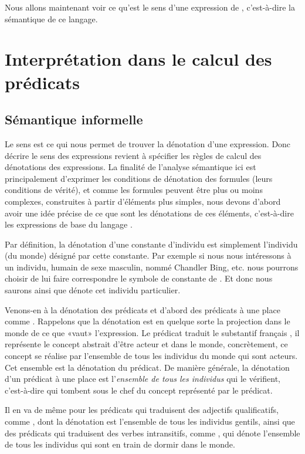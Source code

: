 Nous allons maintenant voir ce qu'est le sens d'une expression de
{\LO}, c'est-à-dire la sémantique de ce langage.



\section{Interprétation dans le calcul des prédicats}
\label{S:semCP}


\subsection{Sémantique informelle}
\label{s:seminf}

Le sens est ce qui nous permet de trouver la dénotation d'une
expression.  Donc décrire le sens des expressions revient à spécifier
les règles de calcul des dénotations des expressions.
La finalité de l'analyse sémantique ici est principalement d'exprimer
les conditions de dénotation des formules (leurs conditions de
vérité), et comme les formules peuvent être plus ou moins complexes,
construites à partir d'éléments plus simples, nous devons d'abord
avoir une idée précise de ce que sont les dénotations de ces éléments,
c'est-à-dire les expressions de base du langage {\LO}.

Par définition, la dénotation d'une constante d'individu est
simplement l'individu (du monde) désigné par cette constante.  Par
exemple si nous nous intéressons à un individu, humain de sexe
masculin, nommé Chandler Bing, etc. nous pourrons choisir de lui faire
correspondre le symbole de constante  de {\LO}.  Et donc nous
saurons ainsi que   dénote cet individu particulier.

Venons-en à la dénotation des prédicats et d'abord des prédicats à une
place comme .  Rappelons que la dénotation est en quelque
sorte la projection dans le monde de ce que «vaut» l'expression.
Le prédicat  traduit le substantif français
, il représente le concept abstrait d'être acteur et
dans le monde, concrètement, ce concept se réalise par l'ensemble de
tous les individus du monde qui sont acteurs.  Cet ensemble est la dénotation
du prédicat.  De manière générale, la dénotation d'un prédicat à une
place est l'\emph{ensemble de tous les individus} qui le vérifient,
c'est-à-dire qui tombent sous le chef du concept représenté par le prédicat.

Il en va de même pour les prédicats qui traduisent des adjectifs
qualificatifs, comme , dont la dénotation est l'ensemble de
tous les individus gentils, ainsi que des prédicats qui traduisent des
verbes intransitifs, comme , qui dénote l'ensemble de tous
les individus qui sont en train de dormir dans le monde.

